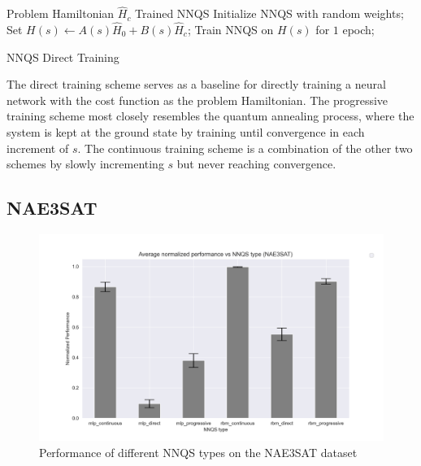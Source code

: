 \begin{algorithm}
    \begin{algorithmic}
    \Require Problem Hamiltonian $\hat{H}_c$
    \Ensure Trained NNQS
    \State Initialize NNQS with random weights;
    \State Set $H(s) \leftarrow A(s)\hat{H}_0 + B(s)\hat{H}_c$;
    \State Train NNQS on $H(s)$ for $1$ epoch;
    \EndFor
    \end{algorithmic}
    \caption{NNQS Direct Training}
    \label{alg:continuous}
\end{algorithm}

The direct training scheme serves as a baseline for directly training a neural network with the cost function as the problem Hamiltonian. The progressive training scheme most closely resembles the quantum annealing process, where the system is kept at the ground state by training until convergence in each increment of $s$. The continuous training scheme is a combination of the other two schemes by slowly incrementing $s$ but never reaching convergence.

\subsection{NAE3SAT}
\begin{figure}[!h]
    \centering
    \includegraphics[width=1\linewidth]{images/nae3sat_nnqs_avg.png}
    \caption{Performance of different NNQS types on the NAE3SAT dataset}
    \label{nnqs-nae3sat-average}
\end{figure}

